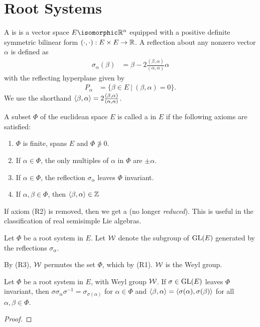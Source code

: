\chapter{Root Systems}
\label{cha:root_systems}

A  is is a vector space $E\isomorphic \RR^n$ equipped with a positive definite symmetric bilinear form $(\cdot,\cdot): E\times E \to \mathbb{R}$. A reflection about any nonzero vector $\alpha$ is defined as
\begin{align}
    \sigma_\alpha(\beta) &= \beta - 2 \frac{(\beta,\alpha)}{(\alpha,\alpha)} \alpha
\end{align}
with the reflecting hyperplane given by
\begin{align}
    P_\alpha &= \{\beta\in E \ |\ (\beta,\alpha)=0\}.
\end{align}
We use the shorthand $\langle\beta,\alpha\rangle=2 \frac{(\beta,\alpha)}{(\alpha,\alpha)}$.

A subset $\Phi$ of the euclidean space $E$ is called a  in $E$ if the following axioms are satisfied:
\begin{enumerate}[(R1)]
    \makethislistcompact
    \item $\Phi$ is finite, spans $E$ and $\Phi\not\ni 0$.
    \item If $\alpha\in \Phi$, the only multiples of $\alpha$ in $\Phi$ are $\pm \alpha$.
    \item If $\alpha\in\Phi$, the reflection $\sigma_\alpha$ leaves $\Phi$ invariant.
    \item If $\alpha,\beta\in \Phi$, then $\langle\beta,\alpha\rangle\in \mathbb{Z}$
\end{enumerate}

\begin{insight}
    If axiom (R2) is removed, then we get a  (no longer \emph{reduced}). This is useful in the classification of real semisimple Lie algebras.
\end{insight}

Let $\Phi$ be a root system in $E$. Let $\mathcal{W}$ denote the subgroup of $\operatorname{GL}(E)$ generated by the reflections $\sigma_\alpha$. 

By (R3), $\mathcal{W}$ permutes the set $\Phi$, which by (R1).
$\mathcal{W}$ is the Weyl group.

\begin{lemma}
    Let $\Phi$  be a root system in $E$, with Weyl group $\mathcal{W}$. If $\sigma\in \operatorname{GL}(E)$ leaves $\Phi$ invariant, then $\sigma \sigma_\alpha \sigma^{-1} = \sigma_{\sigma(\alpha)}$ for $\alpha\in \Phi$ and $\langle\beta,\alpha\rangle=\langle\sigma(\alpha),\sigma(\beta)\rangle$  for all $\alpha,\beta \in \Phi$.
\end{lemma}
\begin{proof}
    
\end{proof}

